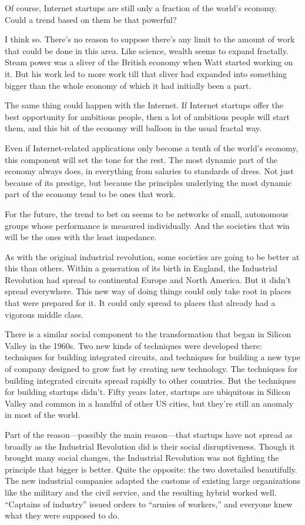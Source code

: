 Of course, Internet startups are still only a fraction of the world's
economy. Could a trend based on them be that powerful?

I think so. There's no reason to suppose there's any limit to the amount
of work that could be done in this area. Like science, wealth seems to
expand fractally. Steam power was a sliver of the British economy when
Watt started working on it. But his work led to more work till that
sliver had expanded into something bigger than the whole economy of
which it had initially been a part.

The same thing could happen with the Internet. If Internet startups
offer the best opportunity for ambitious people, then a lot of ambitious
people will start them, and this bit of the economy will balloon in the
usual fractal way.

Even if Internet-related applications only become a tenth of the world's
economy, this component will set the tone for the rest. The most dynamic
part of the economy always does, in everything from salaries to
standards of dress. Not just because of its prestige, but because the
principles underlying the most dynamic part of the economy tend to be
ones that work.

For the future, the trend to bet on seems to be networks of small,
autonomous groups whose performance is measured individually. And the
societies that win will be the ones with the least impedance.

As with the original industrial revolution, some societies are going to
be better at this than others. Within a generation of its birth in
England, the Industrial Revolution had spread to continental Europe and
North America. But it didn't spread everywhere. This new way of doing
things could only take root in places that were prepared for it. It
could only spread to places that already had a vigorous middle class.

There is a similar social component to the transformation that began in
Silicon Valley in the 1960s. Two new kinds of techniques were developed
there: techniques for building integrated circuits, and techniques for
building a new type of company designed to grow fast by creating new
technology. The techniques for building integrated circuits spread
rapidly to other countries. But the techniques for building startups
didn't. Fifty years later, startups are ubiquitous in Silicon Valley and
common in a handful of other US cities, but they're still an anomaly in
most of the world.

Part of the reason---possibly the main reason---that startups have not
spread as broadly as the Industrial Revolution did is their social
disruptiveness. Though it brought many social changes, the Industrial
Revolution was not fighting the principle that bigger is better. Quite
the opposite: the two dovetailed beautifully. The new industrial
companies adapted the customs of existing large organizations like the
military and the civil service, and the resulting hybrid worked well.
``Captains of industry'' issued orders to ``armies of workers,'' and
everyone knew what they were supposed to do.

